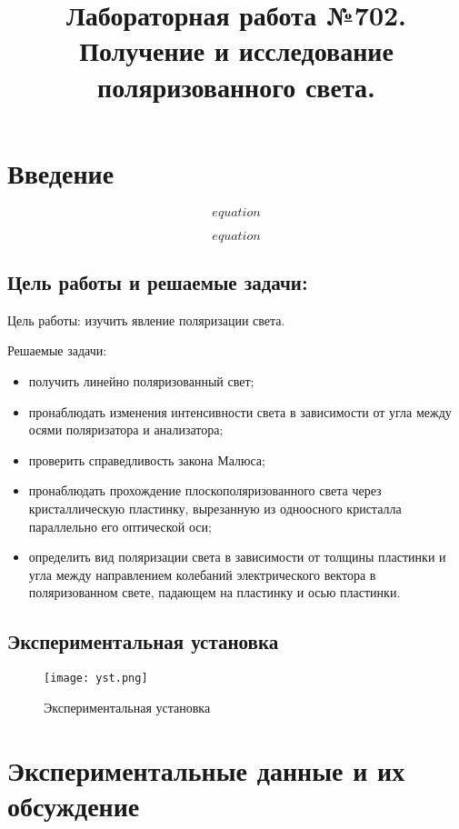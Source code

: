 \documentclass[12pt,a4paper]{article}
\title{Лабораторная работа №702. Получение и исследование поляризованного света.}
\date{}
\begin{document}
	\maketitle
	\thispagestyle{empty}
	\section{Введение}

\begin{equation}
    equation
    \label{key}
\end{equation}

\begin{equation}
    equation
\label{key}
\end{equation}


\subsection{Цель работы и решаемые задачи:}
Цель работы: изучить явление поляризации света.

Решаемые задачи:
\begin{itemize}	
	\item получить линейно поляризованный свет;
	\item пронаблюдать изменения интенсивности света в зависимости от угла между осями поляризатора и анализатора;
	\item проверить справедливость закона Малюса;
	\item пронаблюдать прохождение плоскополяризованного света через кристаллическую пластинку, вырезанную из одноосного кристалла параллельно его оптической оси;

	\item определить вид поляризации света в зависимости от толщины пластинки и угла между направлением колебаний электрического вектора в поляризованном свете, падающем на пластинку и осью пластинки.
\end{itemize}

\subsection{Экспериментальная установка}

\begin{figure}[h]
	\centering
	\texttt{[image: yst.png]}
	\caption{Экспериментальная установка}	
	\label{im:yst}	
\end{figure}

   
\section{Экспериментальные данные и их обсуждение}
\end{document}
